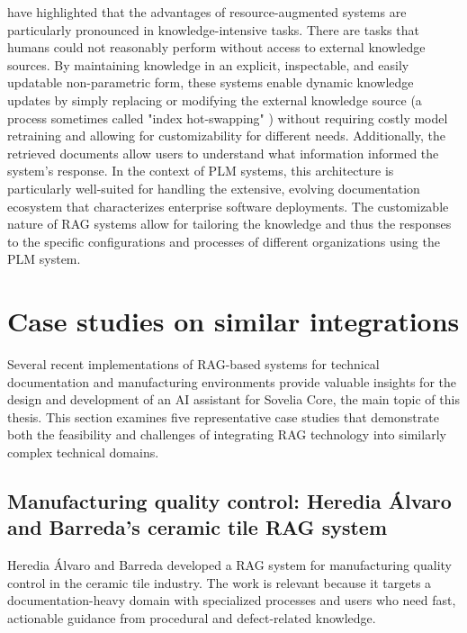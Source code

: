 \textcite{NEURIPS2020_6b493230} have highlighted that the advantages of resource-augmented systems are particularly pronounced in knowledge-intensive tasks. There are tasks that humans could not reasonably perform without access to external knowledge sources. By maintaining knowledge in an explicit, inspectable, and easily updatable non-parametric form, these systems enable dynamic knowledge updates by simply replacing or modifying the external knowledge source (a process sometimes called "index hot-swapping" \parencite{NEURIPS2020_6b493230}) without requiring costly model retraining and allowing for customizability for different needs. Additionally, the retrieved documents allow users to understand what information informed the system's response. In the context of PLM systems, this architecture is particularly well-suited for handling the extensive, evolving documentation ecosystem that characterizes enterprise software deployments. The customizable nature of RAG systems allow for tailoring the knowledge and thus the responses to the specific configurations and processes of different organizations using the PLM system.

\section{Case studies on similar integrations}
\label{sec:case-studies-on-similar-integrations}

Several recent implementations of RAG-based systems for technical documentation and manufacturing environments provide valuable insights for the design and development of an AI assistant for Sovelia Core, the main topic of this thesis. This section examines five representative case studies that demonstrate both the feasibility and challenges of integrating RAG technology into similarly complex technical domains.

\subsection*{Manufacturing quality control: Heredia Álvaro and Barreda's ceramic tile RAG system}

Heredia Álvaro and Barreda \parencite{herediaalvaroAdvancedRetrievalaugmentedGeneration2025} developed a RAG system for manufacturing quality control in the ceramic tile industry. The work is relevant because it targets a documentation-heavy domain with specialized processes and users who need fast, actionable guidance from procedural and defect-related knowledge.

